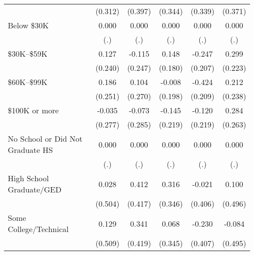 \begin{table}[htbp]
\begin{tabular}{l*{5}{c}}
                    &     (0.312)         &     (0.397)         &     (0.344)         &     (0.339)         &     (0.371)         \\
[1em]
Below \$30K         &       0.000         &       0.000         &       0.000         &       0.000         &       0.000         \\
                    &         (.)         &         (.)         &         (.)         &         (.)         &         (.)         \\
[1em]
\$30K--\$59K        &       0.127         &      -0.115         &       0.148         &      -0.247         &       0.299         \\
                    &     (0.240)         &     (0.247)         &     (0.180)         &     (0.207)         &     (0.223)         \\
[1em]
\$60K--\$99K        &       0.186         &       0.104         &      -0.008         &      -0.424\sym{**} &       0.212         \\
                    &     (0.251)         &     (0.270)         &     (0.198)         &     (0.209)         &     (0.238)         \\
[1em]
\$100K or more      &      -0.035         &      -0.073         &      -0.145         &      -0.120         &       0.284         \\
                    &     (0.277)         &     (0.285)         &     (0.219)         &     (0.219)         &     (0.263)         \\
[1em]
No School or Did Not Graduate HS&       0.000         &       0.000         &       0.000         &       0.000         &       0.000         \\
                    &         (.)         &         (.)         &         (.)         &         (.)         &         (.)         \\
[1em]
High School Graduate/GED&       0.028         &       0.412         &       0.316         &      -0.021         &       0.100         \\
                    &     (0.504)         &     (0.417)         &     (0.346)         &     (0.406)         &     (0.496)         \\
[1em]
Some College/Technical&       0.129         &       0.341         &       0.068         &      -0.230         &      -0.084         \\
                    &     (0.509)         &     (0.419)         &     (0.345)         &     (0.407)         &     (0.495)         \\

\end{tabular}
\end{table}
